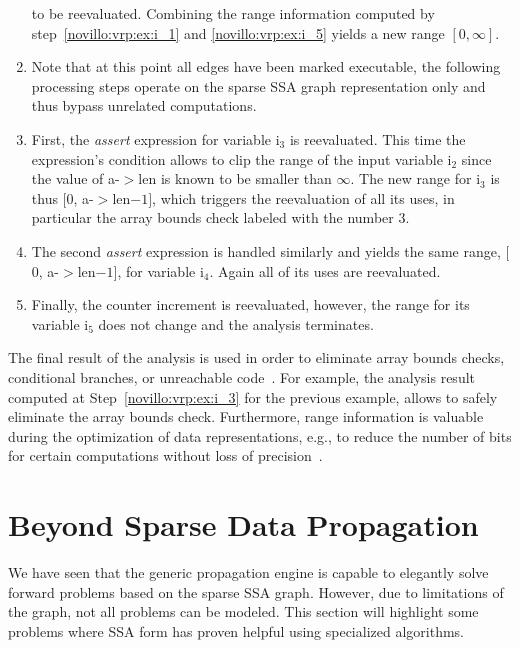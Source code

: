\begin{enumerate}
      to be reevaluated. Combining the range information computed by
      step~\ref{novillo:vrp:ex:i_1} and \ref{novillo:vrp:ex:i_5} yields a new
      range $[0, \infty]$.
\item Note that at this point all edges have been marked executable, the
      following processing steps operate on the sparse SSA graph representation
      only and thus bypass unrelated computations.
\item \label{novillo:vrp:ex:i_3} First, the \emph{assert} expression for
      variable i$_3$ is reevaluated. This time the expression's condition allows
      to clip the range of the input variable i$_2$ since the value of a-$>$len
      is known to be smaller than $\infty$. The new range for i$_3$ is thus
      $[$0, a-$>$len$ - 1]$, which triggers the reevaluation of all its uses,
      in particular the array bounds check labeled with the number $3$.
\item The second \emph{assert} expression is handled similarly and yields the
      same range, $[$0, a-$>$len$ - 1]$, for variable i$_4$. Again all of its
      uses are reevaluated.
\item Finally, the counter increment is reevaluated, however, the range for its
      variable i$_5$ does not change and the analysis terminates.

\end{enumerate}

The final result of the analysis is used in order to eliminate array bounds
checks, conditional branches, or unreachable code~\cite{novillo:bib:BGV00}. For
example, the analysis result computed at Step~\ref{novillo:vrp:ex:i_3} for the
previous example, allows to safely eliminate the array bounds check.
Furthermore, range information is valuable during the optimization of data
representations, e.g., to reduce the number of bits for certain computations
without loss of precision~\cite{novillo:bib:SBA00}.


\section{Beyond Sparse Data Propagation}
\label{novillo:sec:beyond_sparse_data_propagation}

We have seen that the generic propagation engine is capable to elegantly solve
forward problems based on the sparse SSA graph. However, due to limitations of
the graph, not all problems can be modeled.  This section will highlight some
problems where SSA form has proven helpful using specialized algorithms.

